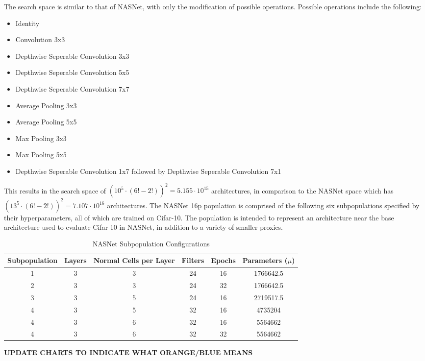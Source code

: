 \documentclass[twocolumn]{article}
\begin{document}
The search space is similar to that of NASNet, with only the modification of possible operations. 
Possible operations include the following:
\begin{multicols}{2}
\begin{itemize}
    \item Identity
    \item Convolution 3x3
    \item Depthwise Seperable Convolution 3x3
    \item Depthwise Seperable Convolution 5x5
    \item Depthwise Seperable Convolution 7x7
    \item Average Pooling 3x3
    \item Average Pooling 5x5
    \item Max Pooling 3x3
    \item Max Pooling 5x5
    \item Depthwise Seperable Convolution 1x7 followed by Depthwise Seperable Convolution 7x1
\end{itemize}
\end{multicols}

This results in the search space of $(10^{5}\cdot(6! - 2!))^{2} = 5.155\cdot10^{15}$ architectures, in comparison to the NASNet space which
has $(13^{5}\cdot(6! - 2!))^{2} = 7.107\cdot10^{16}$ architectures.
The NASNet 16p population is comprised of the following six subpopulations specified by their hyperparameters, all of which are trained on Cifar-10.
The population is intended to represent an architecture near the base architecture used to evaluate Cifar-10 in NASNet, in addition to a variety of smaller
proxies.

\begin{table}[!h]
    \begin{center}
        \begin{tabular}{c | c | c | c | c | c}
            \toprule
            Subpopulation   & Layers & Normal Cells per Layer   & Filters   & Epochs   & Parameters ($\mu$)\\
            \midrule
            1               & 3      & 3                        & 24        & 16       & 1766642.5 \\
            2               & 3      & 3                        & 24        & 32       & 1766642.5 \\
            3               & 3      & 5                        & 24        & 16       & 2719517.5 \\
            4               & 3      & 5                        & 32        & 16       & 4735204 \\
            4               & 3      & 6                        & 32        & 16       & 5564662 \\
            4               & 3      & 6                        & 32        & 32       & 5564662 \\
            \bottomrule
        \end{tabular}
        \caption{NASNet Subpopulation Configurations}
        \label{table:nasnet_details}
    \end{center}
\end{table}



\textbf{UPDATE CHARTS TO INDICATE WHAT ORANGE/BLUE MEANS}
\end{document}
